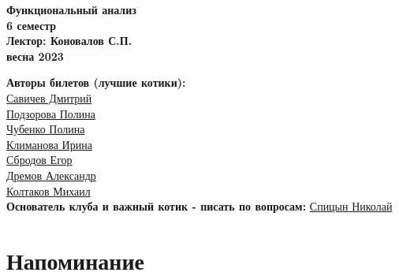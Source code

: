 


    \thispagestyle{empty}
    \BgThispage
    \begin{center}
        \vspace*{4cm}
        
        \Huge
        \textbf{Функциональный анализ} \\
        \textbf{6 семестр} \\
        \textbf{Лектор: Коновалов С.П.} \\
        \textbf{весна 2023} \\
        
        \vspace{7cm}
        \Large
        
        \textbf{Авторы билетов (лучшие котики):} \\
        \href{https://vk.com/dimasav123}{Савичев Дмитрий} \\
        \href{https://vk.com/id165779384}{Подзорова Полина} \\
        \href{https://vk.com/poli.dobro}{Чубенко Полина} \\        
        \href{https://vk.com/meraklim}{Климанова Ирина} \\
        \href{https://vk.com/ulegor}{Сбродов Егор} \\
        \href{https://vk.com/aldrmv}{Дремов Александр} \\
        \href{https://vk.com/id153425653}{Колтаков Михаил} \\

        \textbf{Основатель клуба и важный котик - писать по вопросам:}
        \href{https://vk.com/spitsynn}{Спицын Николай} \\
    \end{center}
\newpage

\tableofcontents
\newpage


\chapter{Напоминание}


% 


